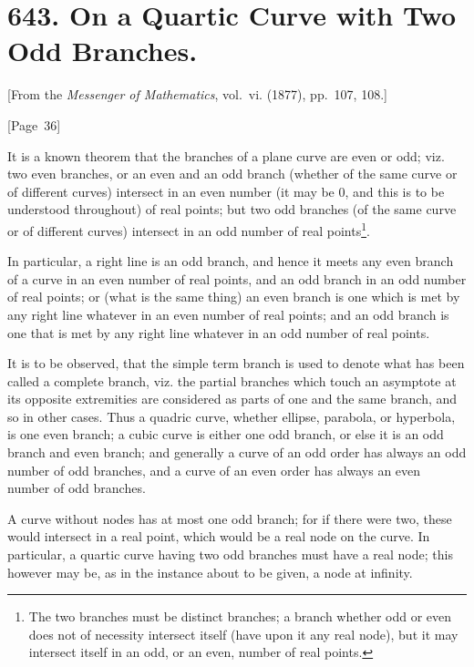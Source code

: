 \documentclass[11pt,a4paper]{article}
\theoremstyle{plain}
\theoremstyle{definition}
\theoremstyle{remark}
\begin{document}
\newpage
\section*{643. On a Quartic Curve with Two Odd Branches.}

[From the \textit{Messenger of Mathematics}, vol.~vi. (1877), pp.~107, 108.]

\begin{center}
[Page~36]
\end{center}

It is a known theorem that the branches of a plane curve are even or odd;
viz. two even branches, or an even and an odd branch (whether of the
same curve or of different curves) intersect in an even number (it may
be 0, and this is to be understood throughout) of real points; but two
odd branches (of the same curve or of different curves) intersect in an
odd number of real points\footnote{The two branches must be distinct branches; a branch whether odd or
even does not of necessity intersect itself (have upon it any real node),
but it may intersect itself in an odd, or an even, number of real points.}.

In particular, a right line is an odd branch, and hence it meets any
even branch of a curve in an even number of real points, and an odd
branch in an odd number of real points; or (what is the same thing) an
even branch is one which is met by any right line whatever in an even
number of real points; and an odd branch is one that is met by any
right line whatever in an odd number of real points.

It is to be observed, that the simple term branch is used to denote
what has been called a complete branch, viz. the partial branches which
touch an asymptote at its opposite extremities are considered as parts
of one and the same branch, and so in other cases. Thus a quadric
curve, whether ellipse, parabola, or hyperbola, is one even branch; a
cubic curve is either one odd branch, or else it is an odd branch and
even branch; and generally a curve of an odd order has always an odd
number of odd branches, and a curve of an even order has always an
even number of odd branches.

A curve without nodes has at most one odd branch; for if there were
two, these would intersect in a real point, which would be a real node
on the curve. In particular, a quartic curve having two odd branches
must have a real node; this however may be, as in the instance about
to be given, a node at infinity.
\end{document}
